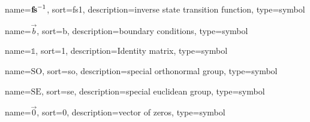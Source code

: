	{%
		name=\ensuremath{\vecfunc{f\!s}^{-1}},
		sort=fs1,
		description=inverse state transition function,
		type=symbol
	}
	\newcommand{\invstatetransfunc}{\gls{sym:invstatetransfunc}}

	{%
		name=\ensuremath{\vec{b}},
		sort=b,
		description=boundary conditions,
		type=symbol
	}
	\newcommand{\boundaryconditions}{\gls{sym:boundaryconditions}}

	{%
		name=\ensuremath{\mathds{1}},
		sort=1,
		description=Identity matrix,
		type=symbol
	}
	\newcommand{\id}{\gls{sym:id}}

	{%
		name=\ensuremath{\mathrm{SO}},
		sort=so,
		description=special orthonormal group,
		type=symbol
	}
	\newcommand{\specialOrthonormalGroupbare}{\gls{sym:specialOrthonormalGroup}}
	\newcommand{\specialOrthonormalGroup}[1]{\ensuremath{\specialOrthonormalGroupbare_{#1}}}

	{%
		name=\ensuremath{\mathrm{SE}},
		sort=se,
		description=special euclidean group,
		type=symbol
	}
	\newcommand{\specialEuclideanGroupbare}{\gls{sym:specialEuclideanGroup}}
	\newcommand{\specialEuclideanGroup}[1]{\ensuremath{\specialEuclideanGroupbare_{#1}}}

	{%
		name=\ensuremath{\vec{0}},
		sort=0,
		description=vector of zeros,
		type=symbol
	}
	\newcommand{\zerovec}{\gls{sym:zerovec}}

